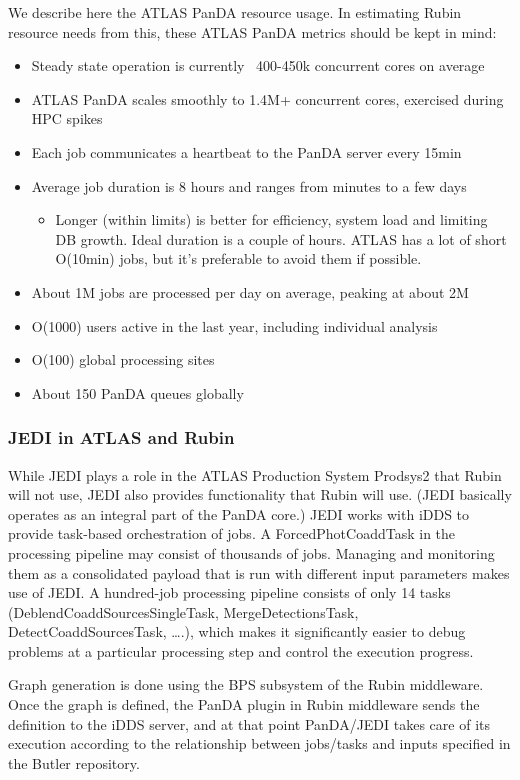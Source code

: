 We describe here the ATLAS PanDA resource usage. In estimating Rubin resource needs from this, these ATLAS PanDA metrics should be kept in mind:

\begin{itemize}
\item Steady state operation is currently ~400-450k concurrent cores on average
\item ATLAS PanDA scales smoothly to 1.4M+ concurrent cores, exercised during HPC spikes
\item Each job communicates a heartbeat to the PanDA server every 15min
\item Average job duration is 8 hours and ranges from minutes to a few days
\begin{itemize}
\item Longer (within limits) is better for efficiency, system load and limiting DB growth. Ideal duration is a couple of hours. ATLAS has a lot of short O(10min) jobs, but it's preferable to avoid them if possible.
\end{itemize}
\item About 1M jobs are processed per day on average, peaking at about 2M
\item O(1000) users active in the last year, including individual analysis
\item O(100) global processing sites
\item About 150 PanDA queues globally
\end{itemize}

\subsubsection{JEDI in ATLAS and Rubin}
While JEDI plays a role in the ATLAS Production System Prodsys2 that Rubin will not use, JEDI also provides functionality that Rubin will use. (JEDI basically operates as an integral part of the PanDA core.)  JEDI works with iDDS to provide task-based orchestration of jobs. A ForcedPhotCoaddTask in the processing pipeline may consist of thousands of jobs. Managing and monitoring them as a consolidated payload that is run with different input parameters makes use of JEDI. A hundred-job processing pipeline consists of only 14 tasks (DeblendCoaddSourcesSingleTask, MergeDetectionsTask, DetectCoaddSourcesTask, ….), which makes it significantly easier to debug problems at a particular processing step and control the execution progress.

Graph generation is done using the BPS subsystem of the Rubin middleware. Once the graph is defined, the PanDA plugin in Rubin middleware sends the definition to the iDDS server, and at that point PanDA/JEDI takes care of its execution according to the relationship between jobs/tasks and inputs specified in the Butler repository.

